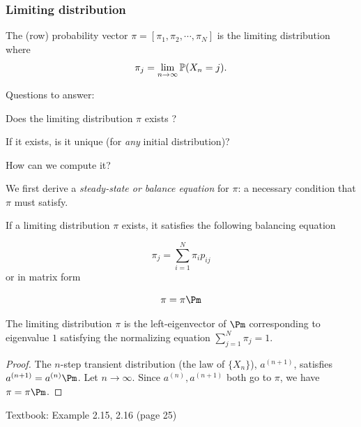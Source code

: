 \documentclass[english,10pt]{beamer}
\begin{document}
\begin{frame}
\frametitle{Limiting distribution}

\begin{definition}
The (row) probability vector $
\pi=[\pi_{1},\pi_{2},\cdots,\pi_{N}] $
is the limiting distribution where 
\[
\pi_{j}=\lim_{n\to\infty} \mathbb{P}(X_{n}=j).
\]

\end{definition}

\pause
\begin{alertblock}{Questions to answer:}
 \biz[<+->]
\item Does the limiting distribution  $\pi$  exists ? 
\item {If it exists, is it unique (for {\it any} initial distribution)?   }
\item  How can  we compute it?
\eiz
\end{alertblock}
\pause
We first derive a {\it steady-state or balance  equation} for $\pi$: a necessary condition that
$\pi$ must satisfy.
 
\end{frame}

\begin{frame}
\begin{theorem}%
If a limiting distribution $\pi$ exists, it satisfies the following
balancing equation

\[
\pi_{j}=\sum_{i=1}^{N}\pi_{i}p_{ij}
\]
or in matrix form

\[
\pi=\pi \Pm
\]
\end{theorem}%
\medskip
 The limiting distribution
$\pi$ is the left-eigenvector of $\Pm$ corresponding to eigenvalue
$1$ satisfying  the normalizing equation 
$\sum_{j=1}^{N}\pi_{j}=1.$
\pause
\begin{proof}
The $n$-step transient distribution (the law of $\{X_n\}$), $a^{(n+1)}$, satisfies 
$a^{(n+1)}=a^{(n)}{\Pm}$. Let $n\to \infty$. Since $a^{(n)}, a^{(n+1)} $ both go to $\pi$,
we have $\pi=\pi\Pm$.
\end{proof}

\pause
\bigskip 
Textbook: 
Example 2.15, 2.16  (page 25)


\end{frame}

\end{document}
